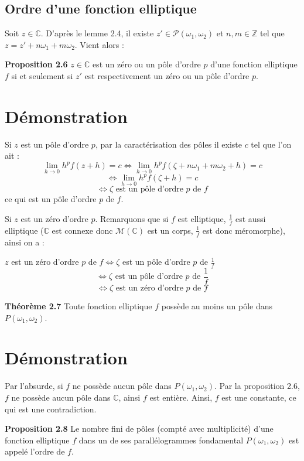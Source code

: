 \documentclass{article}
\begin{document}
\subsection{Ordre d'une fonction elliptique}

Soit $z \in \mathbb{C}$. D'après le lemme 2.4, il existe $z' \in \mathcal{P}(\omega_1, \omega_2)$ et $n, m \in \mathbb{Z}$ tel que $z = z' + n \omega_1 + m \omega_2$. Vient alors :

\textbf{Proposition 2.6}
$z \in \mathbb{C}$ est un zéro ou un pôle d'ordre $p$ d'une fonction elliptique $f$ si et seulement si $z'$ est respectivement un zéro ou un pôle d'ordre $p$.

\section*{Démonstration}

Si $z$ est un pôle d'ordre $p$, par la caractérisation des pôles il existe $c$ tel que l'on ait :
\[
\lim_{h \to 0} h^p f(z + h) = c \iff \lim_{h \to 0} h^p f(\zeta + n\omega_1 + m\omega_2 + h) = c
\]
\[
\iff \lim_{h \to 0} h^p f(\zeta + h) = c
\]
\[
\iff \zeta \text{ est un pôle d'ordre } p \text{ de } f
\]
ce qui est un pôle d'ordre $p$ de $f$.

Si $z$ est un zéro d'ordre $p$. Remarquons que si $f$ est elliptique, $\frac{1}{f}$ est aussi elliptique ($\mathbb{C}$ est connexe donc $\mathcal{M}(\mathbb{C})$ est un corps, $\frac{1}{f}$ est donc méromorphe), ainsi on a :

$z$ est un zéro d'ordre $p$ de $f \iff \zeta$ est un pôle d'ordre $p$ de $\frac{1}{f}$
\[
\iff \zeta \text{ est un pôle d'ordre } p \text{ de } \frac{1}{f}
\]
\[
\iff \zeta \text{ est un zéro d'ordre } p \text{ de } f
\]

\textbf{Théorème 2.7}
Toute fonction elliptique $f$ possède au moins un pôle dans $P(\omega_1, \omega_2)$.


\section*{Démonstration}

Par l'absurde, si $f$ ne possède aucun pôle dans $P(\omega_1, \omega_2)$. Par la proposition 2.6, $f$ ne possède aucun pôle dans $\mathbb{C}$, ainsi $f$ est entière. Ainsi, $f$ est une constante, ce qui est une contradiction.

\textbf{Proposition 2.8}
Le nombre fini de pôles (compté avec multiplicité) d'une fonction elliptique $f$ dans un de ses parallélogrammes fondamental $P(\omega_1, \omega_2)$ est appelé l'ordre de $f$.
\end{document}
